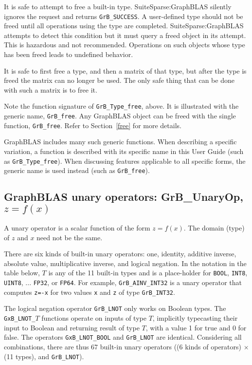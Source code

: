 \documentclass[12pt]{article}
\begin{document}
It is safe to attempt to free a built-in type.  SuiteSparse:GraphBLAS silently
ignores the request and returns \verb'GrB_SUCCESS'.  A user-defined type should
not be freed until all operations using the type are completed.
SuiteSparse:GraphBLAS attempts to detect this condition but it must query a
freed object in its attempt.  This is hazardous and not recommended.
Operations on such objects whose type has been freed leads to undefined
behavior.

It is safe to first free a type, and then a matrix of that type, but after the
type is freed the matrix can no longer be used.  The only safe thing that can
be done with such a matrix is to free it.

Note the function signature of \verb'GrB_Type_free', above.  It is illustrated
with the generic name, \verb'GrB_free'.  Any GraphBLAS object can be freed with
the single function, \verb'GrB_free'.  Refer to Section~\ref{free} for more
details.

GraphBLAS includes many such generic functions.  When describing a specific
variation, a function is described with its specific name in this User Guide
(such as \verb'GrB_Type_free').  When discussing features applicable to all
specific forms, the generic name is used instead (such as \verb'GrB_free').

\newpage
\subsection{GraphBLAS unary operators: {\sf GrB\_UnaryOp}, $z=f(x)$} %
\label{unaryop}

A unary operator is a scalar function of the form $z=f(x)$.  The domain (type)
of $z$ and $x$ need not be the same.

There are six kinds of built-in unary operators:
one, identity, additive inverse, absolute value,
multiplicative inverse, and logical negation.  In the notation in the table
below, $T$ is any of the 11 built-in types and is a place-holder for
\verb'BOOL', \verb'INT8', \verb'UINT8', ...  \verb'FP32', or \verb'FP64'.   For
example, \verb'GrB_AINV_INT32' is a unary operator that computes \verb'z=-x'
for two values \verb'x' and \verb'z' of type \verb'GrB_INT32'.

The logical negation operator \verb'GrB_LNOT' only works on Boolean types.  The
\verb'GxB_LNOT_'$T$ functions operate on inputs of type $T$, implicitly
typecasting their input to Boolean and returning result of type $T$, with a
value 1 for true and 0 for false.  The operators \verb'GxB_LNOT_BOOL' and
\verb'GrB_LNOT' are identical.
Considering all combinations, there are thus 67 built-in unary operators
((6 kinds of operators) $\times$ (11 types), and \verb'GrB_LNOT').
\end{document}
